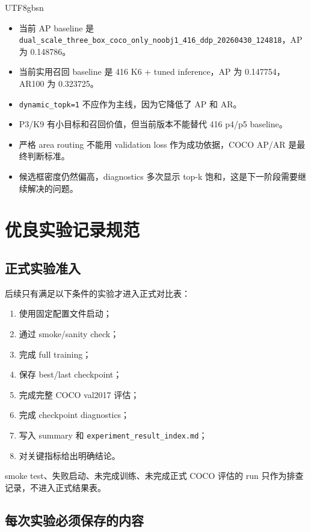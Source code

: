 \documentclass[11pt,a4paper]{article}
\begin{document}
\begin{CJK*}{UTF8}{gbsn}
\begin{itemize}
  \item 当前 AP baseline 是 \texttt{dual\_scale\_three\_box\_coco\_only\_noobj1\_416\_ddp\_20260430\_124818}，AP 为 0.148786。
  \item 当前实用召回 baseline 是 416 K6 + tuned inference，AP 为 0.147754，AR100 为 0.323725。
  \item \texttt{dynamic\_topk=1} 不应作为主线，因为它降低了 AP 和 AR。
  \item P3/K9 有小目标和召回价值，但当前版本不能替代 416 p4/p5 baseline。
  \item 严格 area routing 不能用 validation loss 作为成功依据，COCO AP/AR 是最终判断标准。
  \item 候选框密度仍然偏高，diagnostics 多次显示 top-k 饱和，这是下一阶段需要继续解决的问题。
\end{itemize}

\section{优良实验记录规范}

\subsection{正式实验准入}

后续只有满足以下条件的实验才进入正式对比表：

\begin{enumerate}[label=\arabic*.]
  \item 使用固定配置文件启动；
  \item 通过 smoke/sanity check；
  \item 完成 full training；
  \item 保存 best/last checkpoint；
  \item 完成完整 COCO val2017 评估；
  \item 完成 checkpoint diagnostics；
  \item 写入 summary 和 \texttt{experiment\_result\_index.md}；
  \item 对关键指标给出明确结论。
\end{enumerate}

smoke test、失败启动、未完成训练、未完成正式 COCO 评估的 run 只作为排查记录，不进入正式结果表。

\subsection{每次实验必须保存的内容}


\end{CJK*}
\end{document}
